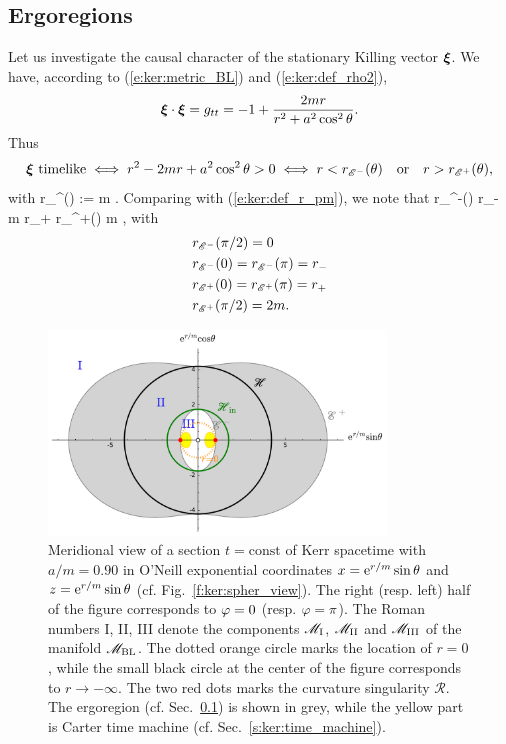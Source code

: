 \subsection{Ergoregions} \label{s:ker:ergoregion}

Let us investigate the causal character of the stationary Killing vector $\bm{\xi}$.
We have, according to (\ref{e:ker:metric_BL}) and (\ref{e:ker:def_rho2}),
\[
    \bm{\xi}\cdot\bm{\xi} = g_{tt} = - 1 + \frac{2m r}{r^2 + a^2\cos^2\theta} .
\]
Thus
\[
    \bm{\xi}\ \mbox{timelike} \iff r^2 - 2 m r + a^2\cos^2\theta > 0
        \iff r < r_{\mathscr{E}^-}(\theta) \quad\mbox{or}\quad  r > r_{\mathscr{E}^+}(\theta) ,
\]
with
\be
    r_{\E^\pm}(\theta) := m \pm {} .
\ee
Comparing with (\ref{e:ker:def_r_pm}), we note that
 \leq r_{\E^-}(\theta) \leq r_- \leq m \leq r_+ \leq r_{\E^+}(\theta)
         m ,
\ee
with
\begin{subequations}
\begin{align}
 & r_{\mathscr{E}^-}(\pi/2) = 0 \\
 & r_{\mathscr{E}^-}(0)  = r_{\mathscr{E}^-}(\pi) = r_- \\
 & r_{\mathscr{E}^+}(0)  = r_{\mathscr{E}^+}(\pi) = r_+ \\
 & r_{\mathscr{E}^+}(\pi/2) = 2 m .
\end{align}
\end{subequations}

\begin{figure}
\centerline{\includegraphics[width=0.8\textwidth]{ker_ergo_a90.pdf}}
\caption[]{\label{f:ker:ergo_a90} \footnotesize
Meridional view of a section $t=\mathrm{const}$ of Kerr spacetime with $a/m=0.90$ in
O'Neill exponential coordinates $x = \mathrm{e}^{r/m}\sin\theta$ and $z = \mathrm{e}^{r/m}\sin\theta$ (cf. Fig.~\ref{f:ker:spher_view}).
The right (resp. left) half of the figure corresponds to $\varphi=0$ (resp. $\varphi=\pi$).
The Roman numbers I, II, III denote the components $\mathscr{M}_{\rm I}$, $\mathscr{M}_{\rm II}$ and
$\mathscr{M}_{\rm III}$ of the manifold $\mathscr{M}_{\rm BL}$. The dotted orange circle marks the location
of $r=0$, while the small black circle at the center of the figure corresponds to
$r\rightarrow -\infty$. The two red dots marks the curvature singularity $\mathscr{R}$.
The ergoregion (cf. Sec.~\ref{s:ker:ergoregion}) is shown in grey, while the
yellow part is Carter time machine (cf. Sec.~\ref{s:ker:time_machine}).
}
\end{figure}

